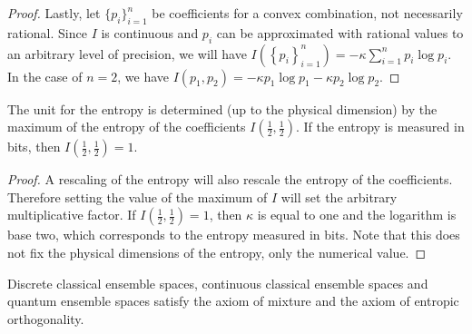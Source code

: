 \begin{proof}
	Lastly, let $\{p_i\}_{i=1}^{n}$ be coefficients for a convex combination, not necessarily rational. Since $I$ is continuous and $p_i$ can be approximated with rational values to an arbitrary level of precision, we will have $I\left(\left\{ p_i\right\}_{i=1}^{n}\right) = - \kappa \sum_{i=1}^{n} p_i \log p_i$. In the case of $n=2$, we have $I(p_1, p_2) = - \kappa p_1 \log p_1 - \kappa p_2 \log p_2$.	
\end{proof}

\begin{coro}
	The unit for the entropy is determined (up to the physical dimension) by the maximum of the entropy of the coefficients $I\left(\frac{1}{2}, \frac{1}{2}\right)$. If the entropy is measured in bits, then $I\left(\frac{1}{2}, \frac{1}{2}\right) = 1$.
\end{coro}

\begin{proof}
	A rescaling of the entropy will also rescale the entropy of the coefficients. Therefore setting the value of the maximum of $I$ will set the arbitrary multiplicative factor. If $I\left(\frac{1}{2}, \frac{1}{2}\right) = 1$, then $\kappa$ is equal to one and the logarithm is base two, which corresponds to the entropy measured in bits. Note that this does not fix the physical dimensions of the entropy, only the numerical value.
\end{proof}

\begin{prop}
	Discrete classical ensemble spaces, continuous classical ensemble spaces and quantum ensemble spaces satisfy the axiom of mixture and the axiom of entropic orthogonality.
\end{prop}

